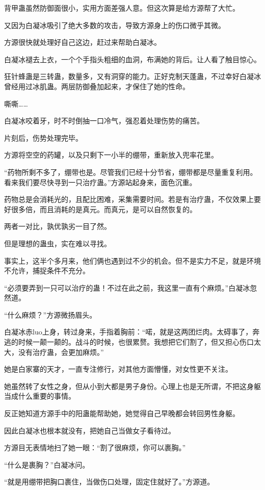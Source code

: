 \begin{this_body}
背甲蛊虽然防御面很小，实用方面差强人意。但这次算是给方源帮了大忙。

又因为白凝冰吸引了绝大多数的攻击，导致方源身上的伤口微乎其微。

方源很快就处理好自己这边，赶过来帮助白凝冰。

白凝冰褪去上衣，一个个手指头粗细的血洞，布满她的背后。让人看了触目惊心。

狂针蜂蛊是三转蛊，数量多，又有洞穿的能力。正好克制天蓬蛊，不过幸好白凝冰曾经用过冰肌蛊。两层防御叠加起来，才保住了她的性命。

嘶嘶……

白凝冰咬着牙，时不时倒抽一口冷气，强忍着处理伤势的痛苦。

片刻后，伤势处理完毕。

方源将空空的药罐，以及只剩下一小半的绷带，重新放入兜率花里。

“药物所剩不多了，绷带也是。尽管我们已经十分节省，绷带都是尽量重复利用。看来我们要尽快寻到一只治疗蛊。”方源站起身来，面色沉重。

药物总是会消耗光的，且配比困难，采集需要时间。若是有治疗蛊，不仅效果上要好很多倍，而且消耗的是真元。而真元，是可以自然恢复的。

两者一对比，孰优孰劣一目了然。

但是理想的蛊虫，实在难以寻找。

事实上，这半个多月来，他们俩也遇到过不少的机会。但不是实力不足，就是环境不允许，捕捉条件不充分。

“必须要弄到一只可以治疗的蛊！不过在此之前，我这里一直有个麻烦。”白凝冰忽然道。

“什么麻烦？”方源微扬眉头。

白凝冰赤luo上身，转过身来，手指着胸前：“喏，就是这两团烂肉。太碍事了，奔逃的时候一颠一颠的。战斗的时候，也很累赘。我想把它们割了，但又担心伤口太大，没有治疗蛊，会更加麻烦。”

她是白家寨的天才，一直专注修行，对其他方面懵懂，对女性更不关注。

她虽然转了女性之身，但从小到大都是男子身份。心理上也是无所谓，不把这身躯当成什么重要的事情。

反正她知道方源手中的阳蛊能帮助她，她觉得自己早晚都会转回男性身躯。

因此白凝冰也根本就没有，把她自己当做女子看待过。

方源目无表情地扫了她一眼：“割了很麻烦，你可以裹胸。”

“什么是裹胸？”白凝冰问。

“就是用绷带把胸口裹住，当做伤口处理，固定住就好了。”方源道。


\end{this_body}
